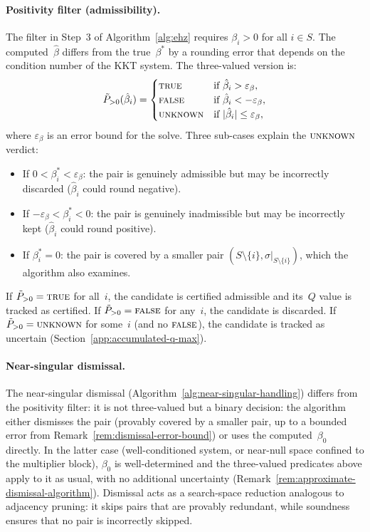 \paragraph{Positivity filter (admissibility).}
The filter in Step~3 of Algorithm~\ref{alg:ehz} requires
$\beta_i > 0$ for all $i \in S$.
The computed~$\hat\beta$ differs from the true~$\beta^*$ by a
rounding error that depends on the condition number of the
KKT system.
The three-valued version is:
\[
  \tilde P_{>0}(\hat\beta_i) =
  \begin{cases}
    \textsc{true}
      & \text{if } \hat\beta_i > \varepsilon_\beta, \\
    \textsc{false}
      & \text{if } \hat\beta_i < -\varepsilon_\beta, \\
    \textsc{unknown}
      & \text{if } |\hat\beta_i| \leq \varepsilon_\beta,
  \end{cases}
\]
where $\varepsilon_\beta$ is an error bound for the solve.
Three sub-cases explain the $\textsc{unknown}$ verdict:
\begin{itemize}
\item If $0 < \beta^*_i < \varepsilon_\beta$:
  the pair is genuinely admissible but may be incorrectly
  discarded ($\hat\beta_i$ could round negative).
\item If $-\varepsilon_\beta < \beta^*_i < 0$:
  the pair is genuinely inadmissible but may be incorrectly
  kept ($\hat\beta_i$ could round positive).
\item If $\beta^*_i = 0$:
  the pair is covered by a smaller
  pair $(S \setminus \{i\}, \sigma|_{S \setminus \{i\}})$,
  which the algorithm also examines.
\end{itemize}
\noindent
If $\tilde P_{>0} = \textsc{true}$ for all~$i$, the candidate
is certified admissible and its~$Q$ value is tracked as
certified.
If $\tilde P_{>0} = \textsc{false}$ for any~$i$, the
candidate is discarded.
If $\tilde P_{>0} = \textsc{unknown}$ for some~$i$ (and no
$\textsc{false}$), the candidate is tracked as uncertain
(Section~\ref{app:accumulated-q-max}).

\paragraph{Near-singular dismissal.}
The near-singular dismissal
(Algorithm~\ref{alg:near-singular-handling})
differs from the positivity filter:
it is not three-valued but a binary decision:
the algorithm either dismisses the pair (provably covered
by a smaller pair, up to a bounded error from
Remark~\ref{rem:dismissal-error-bound}) or uses the
computed~$\beta_0$ directly.
In the latter case (well-conditioned system, or near-null
space confined to the multiplier block), $\beta_0$ is
well-determined and the three-valued predicates above
apply to it as usual, with no additional uncertainty
(Remark~\ref{rem:approximate-dismissal-algorithm}).
Dismissal acts as a search-space reduction analogous to
adjacency pruning: it skips pairs that are provably
redundant, while soundness ensures that no pair is
incorrectly skipped.

